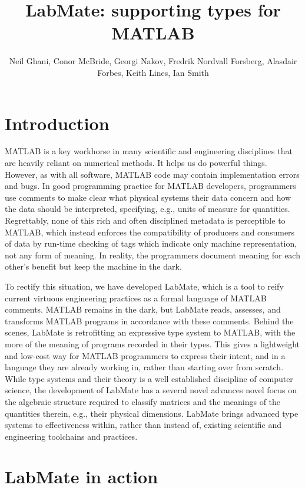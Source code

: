 \documentclass{ws-procs9x6}
\begin{document}
\title{LabMate: supporting types for MATLAB}
\author{Neil Ghani, Conor McBride, Georgi Nakov, Fredrik Nordvall Forsberg, Alasdair Forbes, Keith Lines, Ian Smith}
\address{University of Strathclyde, National Physical Laboratory}

\bodymatter

\section{Introduction}

MATLAB is a key workhorse in many scientific and engineering
disciplines that are heavily reliant on numerical methods. It helps us
do powerful things. However, as with all software, MATLAB code may
contain implementation errors and bugs. In good programming practice
for MATLAB developers, programmers use comments to make clear what
physical systems their data concern and how the data should be
interpreted, specifying, e.g., units of measure for
quantities. Regrettably, none of this rich and often disciplined
metadata is perceptible to MATLAB, which instead enforces the
compatibility of producers and consumers of data by run-time checking
of tags which indicate only machine representation, not any form of
meaning. In reality, the programmers document meaning for each other's
benefit but keep the machine in the dark.

To rectify this situation, we have developed LabMate, which is a tool
to reify current virtuous engineering practices as a formal language
of MATLAB comments. MATLAB remains in the dark, but LabMate reads,
assesses, and transforms MATLAB programs in accordance with these
comments.
%
Behind the scenes, LabMate is retrofitting an expressive type system
to MATLAB, with the more of the meaning of programs recorded in their
types.
%
This gives a lightweight and low-cost way for MATLAB programmers to
express their intent, and in a language they are already working in,
rather than starting over from scratch.
%
While type systems and their theory is a well established discipline
of computer science, the development of LabMate has a several novel
advances novel focus on the algebraic structure required to classify
matrices and the meanings of the quantities therein, e.g., their
physical dimensions. LabMate brings advanced type systems to
effectiveness within, rather than instead of, existing scientific and
engineering toolchains and practices.

\section{LabMate in action}
\label{sec:example}
\end{document}
